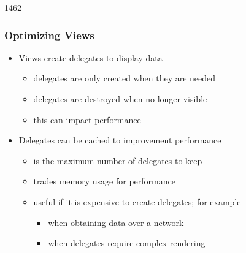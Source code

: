 \begin{slide}{1462}\frametitle{Optimizing Views}

\begin{itemize}
\item Views create delegates to display data
  \begin{itemize}
  \item delegates are only created when they are needed
  \item delegates are destroyed when no longer visible
  \item this can impact performance
  \end{itemize}
\item Delegates can be cached to improvement performance
  \begin{itemize}
  \item {} is the maximum number of delegates to keep
  \item trades memory usage for performance
  \item useful if it is expensive to create delegates; for example
    \begin{itemize}
    \item when obtaining data over a network
    \item when delegates require complex rendering
    \end{itemize}
  \end{itemize}
\end{itemize}
\end{slide}


